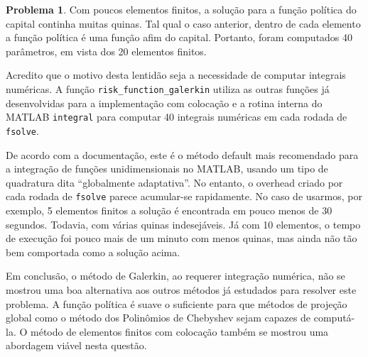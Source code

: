 \documentclass[11pt]{article}
\theoremstyle{definition}
\newtheorem{prob}{Problema}
\theoremstyle{solution}
\begin{document}
\begin{prob}
	Com poucos elementos finitos, a solução para a função política do capital continha muitas quinas. Tal qual o caso anterior, dentro de cada elemento a função política é uma função afim do capital. Portanto, foram computados 40 parâmetros, em vista dos 20 elementos finitos.
	
	Acredito que o motivo desta lentidão seja a necessidade de computar integrais numéricas. A função \texttt{risk\_function\_galerkin} utiliza as outras funções já desenvolvidas para a implementação com colocação e a rotina interna do MATLAB \texttt{integral} para computar 40 integrais numéricas em cada rodada de \texttt{fsolve}.
	
	De acordo com a documentação, este é o método default mais recomendado para a integração de funções unidimensionais no MATLAB, usando um tipo de quadratura dita ``globalmente adaptativa''. No entanto, o overhead criado por cada rodada de \texttt{fsolve} parece acumular-se rapidamente. No caso de usarmos, por exemplo, 5 elementos finitos a solução é encontrada em pouco menos de 30 segundos. Todavia, com várias quinas indesejáveis. Já com 10 elementos, o tempo de execução foi pouco mais de um minuto com menos quinas, mas ainda não tão bem comportada como a solução acima.
	
	Em conclusão, o método de Galerkin, ao requerer integração numérica, não se mostrou uma boa alternativa aos outros métodos já estudados para resolver este problema. A função política é suave o suficiente para que métodos de projeção global como o método dos Polinômios de Chebyshev sejam capazes de computá-la. O método de elementos finitos com colocação também se mostrou uma abordagem viável nesta questão.
\end{prob}
\end{document}
